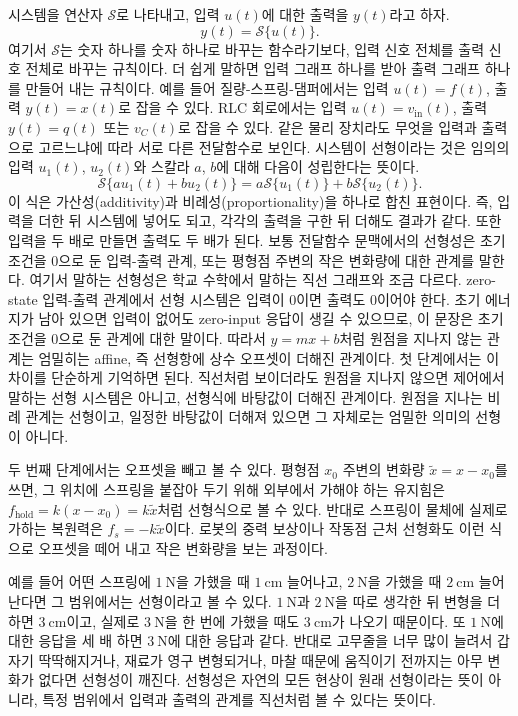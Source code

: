 시스템을 연산자 $\mathcal{S}$로 나타내고, 입력 $u(t)$에 대한 출력을 $y(t)$라고 하자.
\begin{equation}
  y(t) = \mathcal{S}\{u(t)\}.
\end{equation}
여기서 $\mathcal{S}$는 숫자 하나를 숫자 하나로 바꾸는 함수라기보다, 입력 신호 전체를 출력 신호 전체로 바꾸는 규칙이다.
더 쉽게 말하면 입력 그래프 하나를 받아 출력 그래프 하나를 만들어 내는 규칙이다.
예를 들어 질량-스프링-댐퍼에서는 입력 $u(t)=f(t)$, 출력 $y(t)=x(t)$로 잡을 수 있다.
RLC 회로에서는 입력 $u(t)=v_{\mathrm{in}}(t)$, 출력 $y(t)=q(t)$ 또는 $v_C(t)$로 잡을 수 있다.
같은 물리 장치라도 무엇을 입력과 출력으로 고르느냐에 따라 서로 다른 전달함수로 보인다.
시스템이 선형이라는 것은 임의의 입력 $u_1(t)$, $u_2(t)$와 스칼라 $a$, $b$에 대해 다음이 성립한다는 뜻이다.
\begin{equation}
  \mathcal{S}\{a u_1(t) + b u_2(t)\}
  =
  a \mathcal{S}\{u_1(t)\}
  +
  b \mathcal{S}\{u_2(t)\}.
\end{equation}
이 식은 가산성(additivity)과 비례성(proportionality)을 하나로 합친 표현이다.
즉, 입력을 더한 뒤 시스템에 넣어도 되고, 각각의 출력을 구한 뒤 더해도 결과가 같다.
또한 입력을 두 배로 만들면 출력도 두 배가 된다.
보통 전달함수 문맥에서의 선형성은 초기조건을 0으로 둔 입력-출력 관계, 또는 평형점 주변의 작은 변화량에 대한 관계를 말한다.
여기서 말하는 선형성은 학교 수학에서 말하는 직선 그래프와 조금 다르다.
zero-state 입력-출력 관계에서 선형 시스템은 입력이 0이면 출력도 0이어야 한다.
초기 에너지가 남아 있으면 입력이 없어도 zero-input 응답이 생길 수 있으므로, 이 문장은 초기조건을 0으로 둔 관계에 대한 말이다.
따라서 $y=mx+b$처럼 원점을 지나지 않는 관계는 엄밀히는 affine, 즉 선형항에 상수 오프셋이 더해진 관계이다.
첫 단계에서는 이 차이를 단순하게 기억하면 된다.
직선처럼 보이더라도 원점을 지나지 않으면 제어에서 말하는 선형 시스템은 아니고, 선형식에 바탕값이 더해진 관계이다.
원점을 지나는 비례 관계는 선형이고, 일정한 바탕값이 더해져 있으면 그 자체로는 엄밀한 의미의 선형이 아니다.

두 번째 단계에서는 오프셋을 빼고 볼 수 있다.
평형점 $x_0$ 주변의 변화량 $\tilde{x}=x-x_0$를 쓰면, 그 위치에 스프링을 붙잡아 두기 위해 외부에서 가해야 하는 유지힘은 $f_{\mathrm{hold}}=k(x-x_0)=k\tilde{x}$처럼 선형식으로 볼 수 있다.
반대로 스프링이 물체에 실제로 가하는 복원력은 $f_s=-k\tilde{x}$이다.
로봇의 중력 보상이나 작동점 근처 선형화도 이런 식으로 오프셋을 떼어 내고 작은 변화량을 보는 과정이다.

예를 들어 어떤 스프링에 $1~\mathrm{N}$을 가했을 때 $1~\mathrm{cm}$ 늘어나고, $2~\mathrm{N}$을 가했을 때 $2~\mathrm{cm}$ 늘어난다면 그 범위에서는 선형이라고 볼 수 있다.
$1~\mathrm{N}$과 $2~\mathrm{N}$을 따로 생각한 뒤 변형을 더하면 $3~\mathrm{cm}$이고, 실제로 $3~\mathrm{N}$을 한 번에 가했을 때도 $3~\mathrm{cm}$가 나오기 때문이다.
또 $1~\mathrm{N}$에 대한 응답을 세 배 하면 $3~\mathrm{N}$에 대한 응답과 같다.
반대로 고무줄을 너무 많이 늘려서 갑자기 딱딱해지거나, 재료가 영구 변형되거나, 마찰 때문에 움직이기 전까지는 아무 변화가 없다면 선형성이 깨진다.
선형성은 자연의 모든 현상이 원래 선형이라는 뜻이 아니라, 특정 범위에서 입력과 출력의 관계를 직선처럼 볼 수 있다는 뜻이다.

